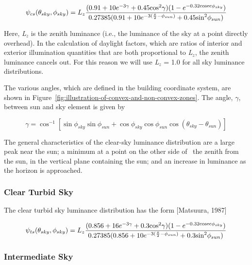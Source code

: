\begin{equation}
{\psi_{cs}}({\theta_{sky}},{\phi_{sky}}) = {L_z}\frac{{(0.91 + 10{e^{ - 3\gamma }} + 0.45{{\cos }^2}\gamma )(1 - {e^{ - 0.32{\rm{cosec}}{\phi_{sky}}}})}}{{0.27385(0.91 + 10{e^{ - 3(\frac{\pi }{2} - {\phi_{sun}})}} + 0.45{{\sin }^2}{\phi_{sun}})}}
\end{equation}

Here, \emph{L\(_{z}\)} is the zenith luminance (i.e., the luminance of the sky at a point directly overhead). In the calculation of daylight factors, which are ratios of interior and exterior illumination quantities that are both proportional to \emph{L\(_{z}\)}, the zenith luminance cancels out. For this reason we will use \emph{L\(_{z}\)} = 1.0 for all sky luminance distributions.

The various angles, which are defined in the building coordinate system, are shown in Figure~\ref{fig:illustration-of-convex-and-non-convex-zones}. The angle, $\gamma$, between sun and sky element is given by

\begin{equation}
\gamma  = {\cos ^{ - 1}}\left[ {\sin {\phi_{sky}}\sin {\phi_{sun}} + \cos {\phi_{sky}}\cos {\phi_{sun}}\cos ({\theta_{sky}} - {\theta_{sun}})} \right]
\end{equation}

The general characteristics of the clear-sky luminance distribution are a large peak near the sun; a minimum at a point on the other side of~ the zenith from the sun, in the vertical plane containing the sun; and an increase in luminance as the horizon is approached.

\subsubsection{Clear Turbid Sky}\label{clear-turbid-sky}

The clear turbid sky luminance distribution has the form {[}Matsuura, 1987{]}

\begin{equation}
{\psi_{ts}}({\theta_{sky}},{\phi_{sky}}) = {L_z}\frac{{(0.856 + 16{e^{ - 3\gamma }} + 0.3{{\cos }^2}\gamma )(1 - {e^{ - 0.32{\rm{cosec}}{\phi_{sky}}}})}}{{0.27385(0.856 + 10{e^{ - 3(\frac{\pi }{2} - {\phi_{sun}})}} + 0.3{{\sin }^2}{\phi_{sun}})}}
\end{equation}

\subsubsection{Intermediate Sky}\label{intermediate-sky}


